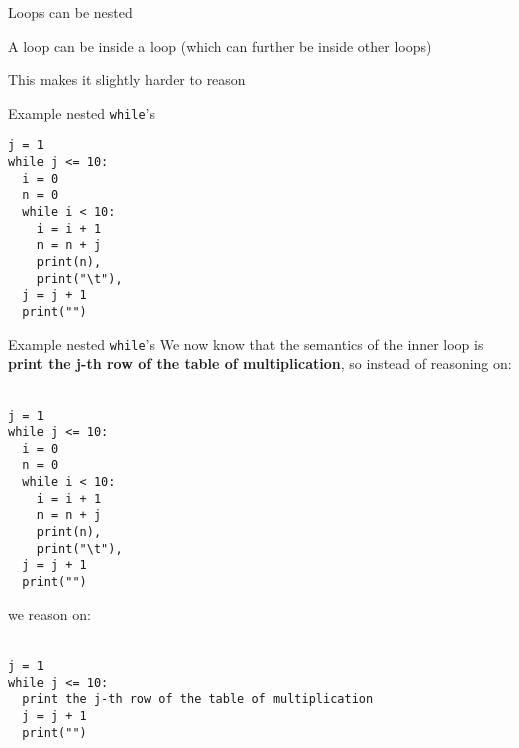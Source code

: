 \documentclass{beamer}
\begin{document}
\begin{slide}{
\item Loops can be nested
\item A loop can be inside a loop (which can further be inside other loops)
\item This makes it slightly harder to reason
}\end{slide}

\begin{frame}[fragile]{Example nested \texttt{while}'s}
\begin{lstlisting}[frame=shadowbox,basicstyle=\ttfamily\tiny]
j = 1
while j <= 10:
  i = 0
  n = 0
  while i < 10:
    i = i + 1
    n = n + j
    print(n),
    print("\t"),
  j = j + 1
  print("")
\end{lstlisting}
\end{frame}

\begin{frame}[fragile]{Example nested \texttt{while}'s}
We now know that the semantics of the inner loop is \textbf{print the j-th row of the table of multiplication}, so instead of reasoning on: \\ \ \\

\begin{lstlisting}[frame=shadowbox,basicstyle=\ttfamily\tiny]
j = 1
while j <= 10:
  i = 0
  n = 0
  while i < 10:
    i = i + 1
    n = n + j
    print(n),
    print("\t"),
  j = j + 1
  print("")
\end{lstlisting}

we reason on: \\ \ \\

\begin{lstlisting}[frame=shadowbox,basicstyle=\ttfamily\tiny]
j = 1
while j <= 10:
  print the j-th row of the table of multiplication
  j = j + 1
  print("")
\end{lstlisting}

\end{frame}
\end{document}
